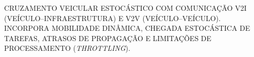 \documentclass{beamer}
\begin{document}
{
\begin{frame}[plain, t]
\color{black}

\vspace{0.35cm}
\hspace{0.3cm}{\Large\bfseries\ttfamily AMBIENTE DE SIMULAÇÃO}

\vspace{0.20cm}
\hspace{0.3cm}
\begin{minipage}{0.92\textwidth}
{\scriptsize\ttfamily\setlength{\baselineskip}{1.5\baselineskip}
CRUZAMENTO VEICULAR ESTOCÁSTICO COM COMUNICAÇÃO V2I (VEÍCULO--INFRAESTRUTURA)
E V2V (VEÍCULO--VEÍCULO). INCORPORA MOBILIDADE DINÂMICA, CHEGADA ESTOCÁSTICA
DE TAREFAS, ATRASOS DE PROPAGAÇÃO E LIMITAÇÕES DE PROCESSAMENTO (\textit{THROTTLING}).
}
\end{minipage}


\end{frame}}
\end{document}
